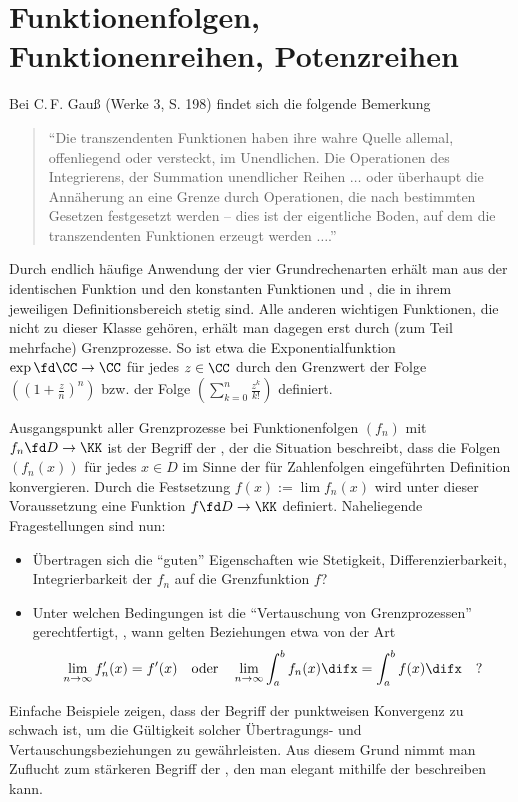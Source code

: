 \chapter{Funktionenfolgen, Funktionenreihen, 
Potenzreihen}\label{funktionenfolgen}

Bei C.\,F. Gauß (Werke 3, S. 198) findet sich die 
folgende Bemerkung
\begin{quote}
"`Die transzendenten Funktionen haben ihre wahre Quelle 
allemal, offenliegend oder versteckt, im Unendlichen. 
Die Operationen des Integrierens, der Summation unendlicher 
Reihen $\ldots$ oder überhaupt die Annäherung an eine 
Grenze durch Operationen, die nach bestimmten 
Gesetzen  festgesetzt werden -- dies ist der 
eigentliche Boden, auf dem die transzendenten Funktionen 
erzeugt werden $\ldots$."'
\end{quote}
Durch endlich häufige Anwendung der vier Grundrechenarten 
erhält man aus der identischen Funktion und den konstanten 
Funktionen  und , 
die in ihrem jeweiligen Definitionsbereich stetig sind. 
Alle anderen wichtigen Funktionen, die nicht zu dieser Klasse gehören,
erhält man dagegen erst durch (zum Teil mehrfache) 
Grenzprozesse. So ist etwa die Exponentialfunktion 
$\exp\fd \CC\to\CC$ für jedes $z\in\CC$ 
durch den Grenzwert der Folge  
$\left( \left( 1+\frac{z}{n} \right )^n \right)$ bzw. der Folge 
$\left( \sum_{k=0}^n \frac{z^k}{k!} \right)$ definiert. 

Ausgangspunkt aller Grenzprozesse bei Funktionenfolgen $(f_n)$ mit 
$f_n\fd D\to\KK$ ist der Begriff der , 
der die Situation beschreibt, dass die Folgen $(f_n(x))$ für jedes $x\in D$ im 
Sinne der für Zahlenfolgen eingeführten Definition konvergieren. 
Durch die Festsetzung $f(x):=\lim f_n(x)$ wird unter dieser Voraussetzung  
eine Funktion $f \fd D \to \KK$ definiert. Naheliegende 
Fragestellungen sind nun:
{\setlength{\labelsep}{4mm}
\begin{itemize}
\item[\desc{i}] Übertragen sich die "`guten"' Eigenschaften wie Stetigkeit, 
Differenzierbarkeit, Integrierbarkeit der $f_n$ auf 
die Grenzfunktion $f$?
\item[\desc{ii}] Unter welchen Bedingungen ist die 
"`Vertauschung von Grenzprozessen"' gerechtfertigt, {\dasheisst},  
wann gelten Beziehungen etwa von der Art
\[
\lim_{n\to\infty} f_n'(x) = f'(x)  
\quad\text{oder}\quad 
\lim_{n\to\infty} \int_a^b  f_n(x) \difx = 
\int_a^b f(x) \difx\quad\text{?}
\]
\end{itemize} }
\noindent
Einfache Beispiele zeigen, dass der Begriff der punktweisen 
Konvergenz zu schwach ist, um die Gültigkeit solcher Übertragungs- 
und Vertauschungsbeziehungen zu gewähr\-lei\-sten. Aus diesem 
Grund nimmt man Zuflucht zum stärkeren Begriff der 
, den man elegant mithilfe der 
 beschreiben kann.

